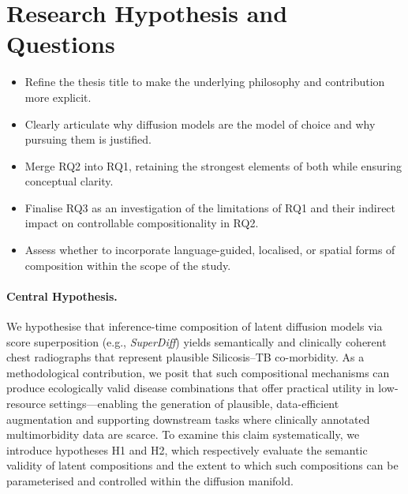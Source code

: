 


\section{Research Hypothesis and Questions}
\label{sec:research_hypothesis}
\begin{itemize}
    \item Refine the thesis title to make the underlying philosophy and contribution more explicit.
    \item Clearly articulate why diffusion models are the model of choice and why pursuing them is justified.
    \item Merge RQ2 into RQ1, retaining the strongest elements of both while ensuring conceptual clarity.
    \item Finalise RQ3 as an investigation of the limitations of RQ1 and their indirect impact on controllable compositionality in RQ2.
    \item Assess whether to incorporate language-guided, localised, or spatial forms of composition within the scope of the study.
\end{itemize}


\paragraph{Central Hypothesis.}
We hypothesise that inference-time composition of latent diffusion models via score superposition (e.g., \emph{SuperDiff}) yields semantically and clinically coherent chest radiographs that represent plausible Silicosis–TB co-morbidity.  
As a methodological contribution, we posit that such compositional mechanisms can produce ecologically valid disease combinations that offer practical utility in low-resource settings—enabling the generation of plausible, data-efficient augmentation and supporting downstream tasks where clinically annotated multimorbidity data are scarce.
To examine this claim systematically, we introduce hypotheses H1 and H2, which respectively evaluate the semantic validity of latent compositions and the extent to which such compositions can be parameterised and controlled within the diffusion manifold.


